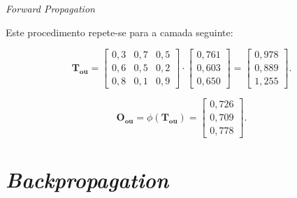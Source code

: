\begin{frame}[fragile]{\textit{Forward Propagation} \cont}

    Este procedimento repete-se para a camada seguinte:
    
    \begin{figure}
        \centering
        
    \end{figure}
   
    \begin{equation}
        \mathbf{T_{\text{ou}}} = \begin{bmatrix}
            0,3 & 0,7 & 0,5 \\ 
            0,6 & 0,5 & 0,2 \\ 
            0,8 & 0,1 & 0,9
        \end{bmatrix}
        \cdot
        \begin{bmatrix}
            0,761\\ 
            0,603\\ 
            0,650
        \end{bmatrix}
        =
        \begin{bmatrix}
            0,978\\ 
            0,889\\ 
            1,255
        \end{bmatrix}.
    \end{equation} 
     
    \begin{equation}
        \mathbf{O_{\text{ou}}} = \phi (\mathbf{T_{\text{ou}}} )
        = 
        \begin{bmatrix}
            0,726\\ 
            0,709\\ 
            0,778
        \end{bmatrix}.
    \end{equation}

\end{frame}
  
\section{\textit{Backpropagation}}

